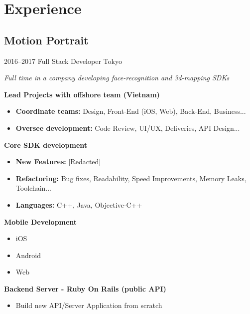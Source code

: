 \documentclass[]{template/friggeri-cv} %
\begin{document}

\section{Experience}


\subsection{Motion Portrait}
\begin{entrylist}


\entry
{2016--2017}
{Full Stack Developer}
{Tokyo}
{\emph{Full time in a company developing face-recognition and 3d-mapping SDKs}

\textbf{Lead Projects with offshore team (Vietnam)} 
\begin{itemize}
\item \textbf{Coordinate teams:} Design, Front-End (iOS, Web), Back-End, Business...
\item \textbf{Oversee development:} Code Review, UI/UX, Deliveries, API Design...
\end{itemize}
\textbf{Core SDK development} 
\begin{itemize}
\item \textbf{New Features:} [Redacted]
\item \textbf{Refactoring:} Bug fixes, Readability, Speed Improvements, Memory Leaks, Toolchain...
\item \textbf{Languages:} C++, Java, Objective-C++

\end{itemize}
\textbf{Mobile Development} 
\begin{itemize}
\item iOS
\item Android
\item Web
\end{itemize}

\textbf{Backend Server - Ruby On Rails (public API)} 
\begin{itemize}
\item Build new API/Server Application from scratch
\end{itemize}
}
\end{entrylist}
\end{document}
